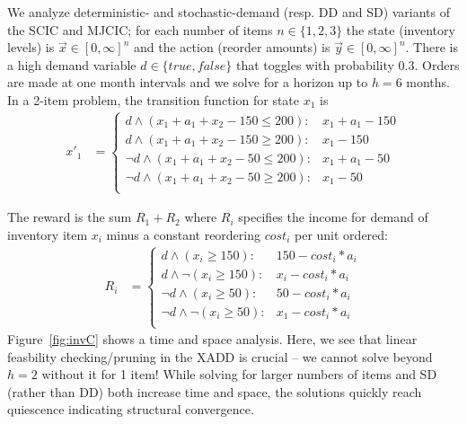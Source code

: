 We analyze deterministic- and
stochastic-demand (resp. DD and SD) variants of the SCIC and MJCIC; 
for each number of items $n \in \{
1,2,3 \}$ the state (inventory levels) is $\vec{x} \in [0,\infty]^n$
and the action (reorder amounts) is $\vec{y} \in [0,\infty]^n$.
There is a high demand variable $d \in \{ \mathit{true},\mathit{false} \}$
that toggles with probability $0.3$.  
Orders are made at one month intervals and we solve for a horizon up
to $h=6$ months.  In a 2-item problem, the transition function 
for state $x_1$ is
{\footnotesize
\vspace{-2mm}
\begin{align*}
x'_1 & = \begin{cases}
d  \wedge (x_1 + a_1 + x_2 - 150 \leq 200) : & x_1 + a_1 - 150 \\
d  \wedge (x_1 + a_1 + x_2 - 150 \geq 200) : & x_1 - 150  \\
\neg d \wedge (x_1 + a_1 + x_2 - 50 \leq 200): & x_1 + a_1 - 50    \\
\neg d \wedge (x_1 + a_1 + x_2 - 50 \geq 200): & x_1 - 50    \\
\end{cases}
\end{align*}}

The reward is the sum $R_1 + R_2$ where $R_i$ 
specifies the income for demand of inventory item $x_i$ minus a constant
reordering $\mathit{cost}_i$ per unit ordered:
{\footnotesize
\begin{align*}
R_i & = \begin{cases}
d \wedge (x_i \geq 150) : & 150 - \mathit{cost}_i*a_i \\
d \wedge \neg(x_i \geq 150) :&   x_i - \mathit{cost}_i*a_i \\
\neg d \wedge (x_i \geq 50) :& 50 - \mathit{cost}_i*a_i  \\
\neg d \wedge \neg(x_i \geq 50) :& x_1 - \mathit{cost}_i*a_i  \\
\end{cases}
\end{align*}}
Figure~\ref{fig:invC} shows a time and space analysis.  
Here, we see that linear feasbility
checking/pruning in the XADD is crucial -- we cannot solve beyond
$h=2$ without it for 1 item!  While solving for larger numbers of
items and SD (rather than DD) both increase time and space, 
the solutions quickly reach quiescence indicating structural
convergence.

